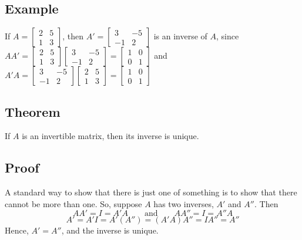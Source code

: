 \subsection*{Example}
If $A=\begin{bmatrix}
        2 & 5 \\
        1 & 3
    \end{bmatrix}$, then $A'=\begin{bmatrix}
        3  & -5 \\
        -1 & 2
    \end{bmatrix}$ is an inverse of $A$, since\\ $AA'=\begin{bmatrix}
        2 & 5 \\
        1 & 3
    \end{bmatrix}\begin{bmatrix}
        3  & -5 \\
        -1 & 2
    \end{bmatrix}=\begin{bmatrix}
        1 & 0 \\
        0 & 1
    \end{bmatrix}$ and $A'A=\begin{bmatrix}
        3  & -5 \\
        -1 & 2
    \end{bmatrix}\begin{bmatrix}
        2 & 5 \\
        1 & 3
    \end{bmatrix}=\begin{bmatrix}
        1 & 0 \\
        0 & 1
    \end{bmatrix}$

\subsection*{Theorem}
If $A$ is an invertible matrix, then its inverse is unique.

\subsection*{Proof}
A standard way to show that there is just one of something is to show that there
cannot be more than one. So, suppose $A$ has two inverses, $A'$ and $A''$. Then
\[AA'=I=A'A \qquad \text{and} \qquad AA''=I=A''A\]
\[A'=A'I=A'(A'')=(A'A)A''=IA''=A''\]
Hence, $A'=A''$, and the inverse is unique.

